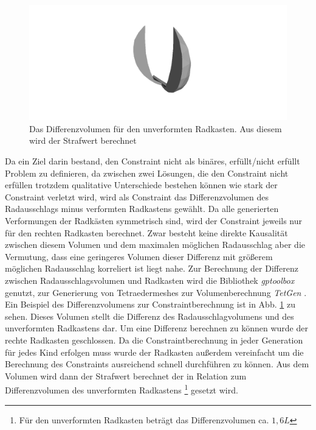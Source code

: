 \begin{figure}[h]
	\centering
	\includegraphics[width=.5\linewidth]{bilder/difference.png}
	\caption{Das Differenzvolumen für den unverformten Radkasten. Aus diesem wird der Strafwert berechnet}
	\label{fig:diff_volume}
\end{figure}
Da ein Ziel darin bestand, den Constraint nicht als binäres, erfüllt/nicht erfüllt Problem zu definieren, da zwischen zwei Lösungen, die den Constraint nicht erfüllen trotzdem qualitative Unterschiede bestehen können wie stark der Constraint verletzt wird, wird als Constraint das Differenzvolumen des Radausschlags minus verformten Radkastens gewählt.
Da alle generierten Verformungen der Radkästen symmetrisch sind, wird der Constraint jeweils nur für den rechten Radkasten berechnet.
Zwar besteht keine direkte Kausalität zwischen diesem Volumen und dem maximalen möglichen Radausschlag aber die Vermutung, dass eine geringeres Volumen dieser Differenz mit größerem möglichen Radausschlag korreliert ist liegt nahe.
Zur Berechnung der Differenz zwischen Radausschlagsvolumen und Radkasten wird die Bibliothek \textit{gptoolbox} \cite{gptoolbox.b} genutzt, zur Generierung von Tetraedermeshes zur Volumenberechnung \textit{TetGen} \cite{Si.2015}.
Ein Beispiel des Differenzvolumens zur Constraintberechnung ist in Abb. \ref{fig:diff_volume} zu sehen.
Dieses Volumen stellt die Differenz des Radausschlagvolumens und des unverformten Radkastens dar.
Um eine Differenz berechnen zu können wurde der rechte Radkasten geschlossen.
Da die Constraintberechnung in jeder Generation für jedes Kind erfolgen muss wurde der Radkasten außerdem vereinfacht um die Berechnung  des Constraints ausreichend schnell durchführen zu können.
Aus dem Volumen wird dann der Strafwert berechnet der in Relation zum Differenzvolumen des unverformten Radkastens
\footnote{Für den unverformten Radkasten beträgt das Differenzvolumen ca. $1,6L$} gesetzt wird.

